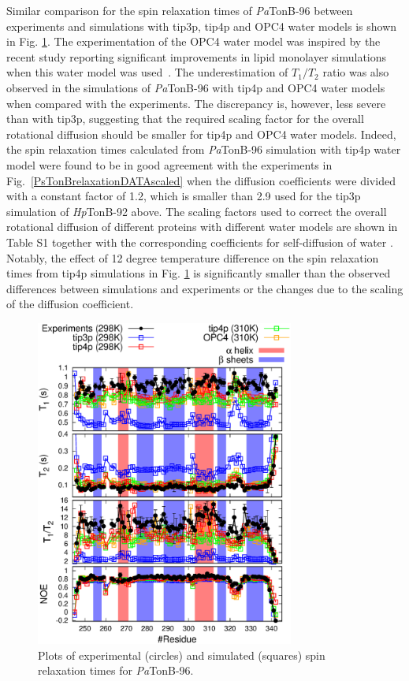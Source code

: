 \documentclass[journal=jpcbfk,manuscript=article]{achemso}
\begin{document}
Similar comparison for the spin relaxation times of {\it Pa}TonB-96 
between experiments and simulations with tip3p, tip4p and OPC4 water models
is shown in Fig. \ref{PsTonBrelaxationDATA}.
The experimentation of the OPC4 water model was inspired by the
recent study reporting significant improvements in lipid monolayer
simulations when this water model was used~\cite{javanainen18}. 
The underestimation of $T_1/T_2$ ratio was 
also observed in the simulations of {\it Pa}TonB-96 with
tip4p and OPC4 water models when compared with the experiments.
The discrepancy is, however, less severe than with tip3p, suggesting that 
the required scaling factor for the overall rotational diffusion should
be smaller for tip4p and OPC4 water models.
Indeed, the spin relaxation times calculated
from {\it Pa}TonB-96 simulation with tip4p water model
were found to be in good agreement with the experiments in Fig.~\ref{PsTonBrelaxationDATAscaled}
when the diffusion coefficients were divided with a constant factor of 1.2,
which is smaller than 2.9 used for the tip3p simulation of {\it Hp}TonB-92 above.
The scaling factors used to correct the overall rotational diffusion
of different proteins with different water models are shown in Table S1
together with the corresponding coefficients for self-diffusion of water \cite{wong08,izadi14}.
Notably, the effect of 12 degree temperature difference
on the spin relaxation times from tip4p simulations in Fig. \ref{PsTonBrelaxationDATA}
is significantly smaller than the observed differences between simulations and experiments or
the changes due to the scaling of the diffusion coefficient.
\begin{figure}[tb]
  \includegraphics[width=8.5cm]{../Figs/PsTonBrelaxationDATA.eps}%
  \caption{Plots of experimental (circles) and simulated (squares) spin relaxation times
    for {\it Pa}TonB-96. \label{PsTonBrelaxationDATA}}%
\end{figure}
\end{document}
